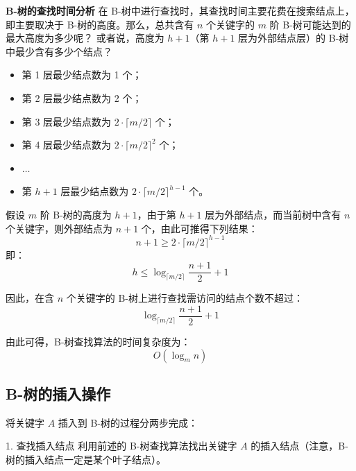 \documentclass[lang=cn,newtx,10pt,scheme=chinese]{elegantbook}
\begin{document}
\textbf{B-树的查找时间分析}  
在 B-树中进行查找时，其查找时间主要花费在搜索结点上，即主要取决于 B-树的高度。那么，总共含有 $n$ 个关键字的 $m$ 阶 B-树可能达到的最大高度为多少呢？
或者说，高度为 $h+1$（第 $h+1$ 层为外部结点层）的 B-树中最少含有多少个结点？

\begin{itemize}
  \item 第 1 层最少结点数为 1 个；
  \item 第 2 层最少结点数为 2 个；
  \item 第 3 层最少结点数为 $2 \cdot \lceil m/2 \rceil$ 个；
  \item 第 4 层最少结点数为 $2 \cdot \lceil m/2 \rceil^2$ 个；
  \item $\dots$
  \item 第 $h+1$ 层最少结点数为 $2 \cdot \lceil m/2 \rceil^{h-1}$ 个。
\end{itemize}

假设 $m$ 阶 B-树的高度为 $h+1$，由于第 $h+1$ 层为外部结点，而当前树中含有 $n$ 个关键字，则外部结点为 $n+1$ 个，由此可推得下列结果：
\[
n+1 \geq 2 \cdot \lceil m/2 \rceil^{h-1}
\]
即：
\[
h \leq \log_{\lceil m/2 \rceil} \frac{n+1}{2} + 1
\]

因此，在含 $n$ 个关键字的 B-树上进行查找需访问的结点个数不超过：
\[
\log_{\lceil m/2 \rceil} \frac{n+1}{2} + 1
\]

由此可得，B-树查找算法的时间复杂度为：
\[
O(\log_m n)
\]
\subsection{B-树的插入操作}

将关键字 $A$ 插入到 B-树的过程分两步完成：

1. 查找插入结点  
   利用前述的 B-树查找算法找出关键字 $A$ 的插入结点（注意，B-树的插入结点一定是某个叶子结点）。
\end{document}
